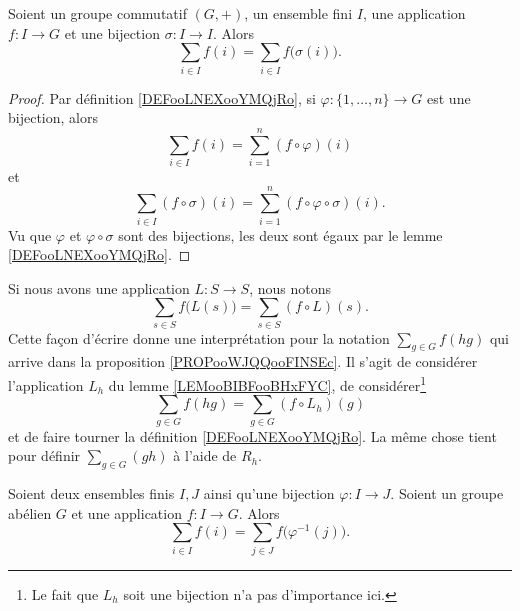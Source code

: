 \begin{proposition}     \label{PROPooJBQVooNqWErk}
	Soient un groupe commutatif \( (G,+)\), un ensemble fini \( I\), une application \( f\colon I\to G\) et une bijection \( \sigma\colon I\to I\). Alors
	\begin{equation}
		\sum_{i\in I}f(i)=\sum_{i\in I}f\big( \sigma(i) \big).
	\end{equation}
\end{proposition}

\begin{proof}
	Par définition \ref{DEFooLNEXooYMQjRo}, si \(\varphi \colon \{ 1,\ldots,n \}\to G  \) est une bijection, alors
	\begin{equation}
		\sum_{i\in I}f(i)=\sum_{i=1}^n(f\circ\varphi)(i)
	\end{equation}
	et
	\begin{equation}
		\sum_{i\in I}(f\circ\sigma)(i)=\sum_{i=1}^n(f\circ\varphi\circ \sigma)(i).
	\end{equation}
	Vu que \( \varphi\) et \( \varphi\circ\sigma\) sont des bijections, les deux sont égaux par le lemme \ref{DEFooLNEXooYMQjRo}.
\end{proof}

Si nous avons une application \( L\colon S\to S\), nous notons
\begin{equation}
	\sum_{s\in S}f\big( L(s) \big)=\sum_{s\in S}(f\circ L)(s).
\end{equation}
Cette façon d'écrire donne une interprétation pour la notation \( \sum_{g\in G}f(hg)\) qui arrive dans la proposition \ref{PROPooWJQQooFINSEc}. Il s'agit de considérer l'application \( L_h\) du lemme \ref{LEMooBIBFooBHxFYC}, de considérer\footnote{Le fait que \( L_h\) soit une bijection n'a pas d'importance ici.}
\begin{equation}        \label{EQooQQBEooFDOBVG}
	\sum_{g\in G}f(hg)=\sum_{g\in G}(f\circ L_h)(g)
\end{equation}
et de faire tourner la définition \ref{DEFooLNEXooYMQjRo}. La même chose tient pour définir \( \sum_{g\in G}(gh)\) à l'aide de \( R_h\).


\begin{lemma}		\label{LEMooGAMAooOAFhrc}
	Soient deux ensembles finis \( I,J\) ainsi qu'une bijection \(\varphi \colon I\to J  \). Soient un groupe abélien \( G\) et une application \(f \colon I\to G  \). Alors
	\begin{equation}
		\sum_{i\in I}f(i)=\sum_{j\in J}f\big( \varphi^{-1}(j) \big).
	\end{equation}
\end{lemma}

